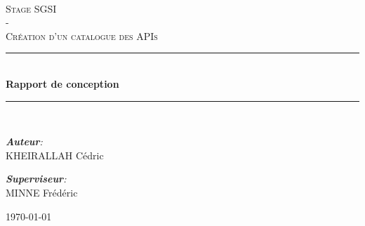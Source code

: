 \begin{titlepage}

    \newcommand{\HRule}{\rule{\linewidth}{0.5mm}} %
    \center 
     
    \vspace*{0.8cm}
    \\[1cm]
    
    \textsc{\Large Stage SGSI\\ - \\ \bigskip Création d'un catalogue des APIs}\\[1.5cm] %
    
    \HRule \\[0.8cm]
    
    {\huge \bfseries Rapport de conception}\\[0.7cm] %
    
    \HRule \\[1.5cm]
    
    
    \large
    

    \emph{\textbf{Auteur}:}\\
    KHEIRALLAH Cédric\\

    \vspace{1cm}

    \emph{\textbf{Superviseur}:}\\
    MINNE Frédéric\\

    \vfill
    
    \large \today
    
\end{titlepage}